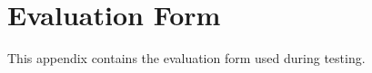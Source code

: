 %
%
%                 

\chapter{Evaluation Form}
\label{sec:appendixn}

This appendix contains the evaluation form used during testing. 

